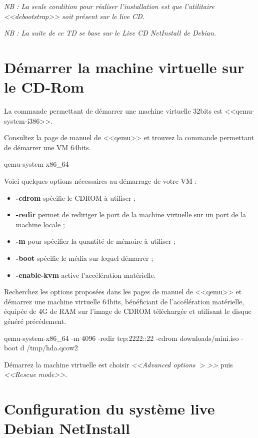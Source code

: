 \documentclass[11pt]{article}
\begin{document}
\emph{NB : La seule condition pour réaliser l'installation est que l'utilitaire
<<debootstrap>> soit présent sur le live CD.}

\emph{NB : La suite de ce TD se base sur le Live CD NetInstall de Debian.}

\section{Démarrer la machine virtuelle sur le CD-Rom}

La commande permettant de démarrer une machine virtuelle 32bits est
<<qemu-system-i386>>.

Consultez la page de manuel de <<qemu>> et trouvez la commande permettant de
démarrer une VM 64bits.

\begin{solution}
qemu-system-x86\_64
\end{solution}

Voici quelques options nécessaires au démarrage de votre VM :

\begin{itemize}
 \item \textbf{-cdrom} spécifie le CDROM à utiliser ;
 \item \textbf{-redir} permet de rediriger le port de la machine virtuelle sur
un port de la machine locale ;
 \item \textbf{-m} pour spécifier la quantité de mémoire à utiliser ;
 \item \textbf{-boot} spécifie le média sur lequel démarrer ;
 \item \textbf{-enable-kvm} active l'accélération matérielle.
\end{itemize}

Recherchez les options proposées dans les pages de manuel de <<qemu>> et
démarrez une machine virtuelle 64bits, bénéficiant de l'accélération matérielle,
équipée de 4G de RAM sur l'image de CDROM téléchargée et utilisant le disque
généré précédement.

\begin{solution}
qemu-system-x86\_64 -m 4096 -redir tcp:2222::22 -cdrom downloads/mini.iso -boot
d /tmp/hda.qcow2
\end{solution}

Démarrez la machine virtuelle est choisir \emph{<<Advanced options $>$>>} puis
\emph{<<Rescue mode>>}.

\section{Configuration du système live Debian NetInstall}
\end{document}
